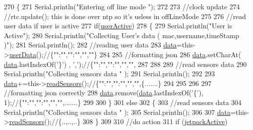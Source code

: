 \begin{DoxyCode}
270 \{
271     Serial.println(\textcolor{stringliteral}{"Entering off line mode "});  
272     
273     \textcolor{comment}{//clock update}
274     \textcolor{comment}{//rtc.update(); this is done over ntp so it's usless in offLineMode}
275     
276     \textcolor{comment}{//read user data if user is active}
277     \textcolor{keywordflow}{if}(\hyperlink{classCoolBoard_a6395459131d6889a3005f79c7a35e964}{userActive})
278     \{
279         Serial.println(\textcolor{stringliteral}{"User is Active"});
280         Serial.println(\textcolor{stringliteral}{"Collecting User's data ( mac,username,timeStamp )"});
281         Serial.println();
282         \textcolor{comment}{//reading user data}
283         \hyperlink{classCoolBoard_a427fb753dd8575bdf821c70a5c63d695}{data}=this->\hyperlink{classCoolBoard_ae7358fb6e623cfc81b775f5f1734909b}{userData}();\textcolor{comment}{//\{"":"","":"","",""\}}
284 
285         \textcolor{comment}{//formatting json }
286         \hyperlink{classCoolBoard_a427fb753dd8575bdf821c70a5c63d695}{data}.setCharAt( \hyperlink{classCoolBoard_a427fb753dd8575bdf821c70a5c63d695}{data}.lastIndexOf(\textcolor{charliteral}{'\}'}) , \textcolor{charliteral}{','});\textcolor{comment}{//\{"":"","":"","","",}
287         
288                 
289         \textcolor{comment}{//read sensors data}
290         Serial.println(\textcolor{stringliteral}{"Collecting sensors data "} );
291         Serial.println();
292 
293         \hyperlink{classCoolBoard_a427fb753dd8575bdf821c70a5c63d695}{data}+=this->\hyperlink{classCoolBoard_ad03abdce2e65f520bbf2cff0f2d083cf}{readSensors}();\textcolor{comment}{//\{"":"","":"","","",\{.......\}}
294 
295         
296 
297         \textcolor{comment}{//formatting json correctly}
298         \hyperlink{classCoolBoard_a427fb753dd8575bdf821c70a5c63d695}{data}.remove(\hyperlink{classCoolBoard_a427fb753dd8575bdf821c70a5c63d695}{data}.lastIndexOf(\textcolor{charliteral}{'\{'}), 1);\textcolor{comment}{//\{"":"","":"","","",.......\}}
299                 
300     \}   
301     \textcolor{keywordflow}{else}
302     \{
303         \textcolor{comment}{//read sensors data}
304         Serial.println(\textcolor{stringliteral}{"Collecting sensors data "} );
305         Serial.println();
306 
307         \hyperlink{classCoolBoard_a427fb753dd8575bdf821c70a5c63d695}{data}=this->\hyperlink{classCoolBoard_ad03abdce2e65f520bbf2cff0f2d083cf}{readSensors}();\textcolor{comment}{//\{..,..,..\}}
308     \}
309 
310     \textcolor{comment}{//do action}
311     \textcolor{keywordflow}{if} (\hyperlink{classCoolBoard_a9be03a913d26e558328935ca3b59a75e}{jetpackActive})

\end{DoxyCode}

